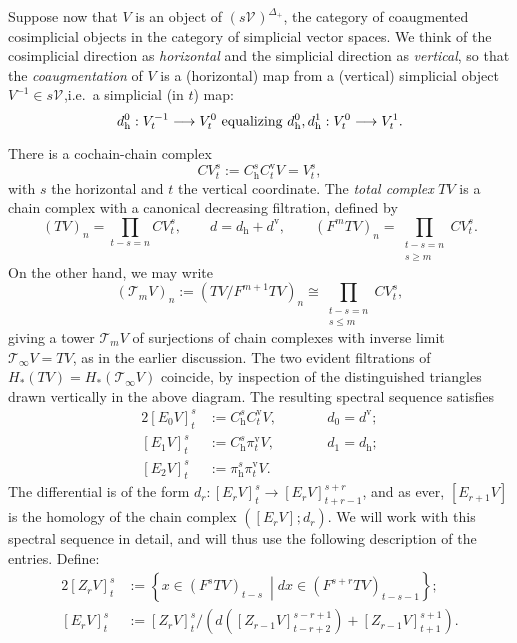 \documentclass[11pt]{amsart} \renewcommand{\baselinestretch}{1.2}
\theoremstyle{plain}
\theoremstyle{definition}
\renewcommand{\to}{\longrightarrow}
\newcommand{\calT}{\mathcal{T}}
\newcommand{\calV}{\mathcal{V}}
\newcommand{\vect}[2]{\calV^{#1}_{#2}}
\newcommand{\E}[5]{[E^{#1}_{#2}#3]^{#4}_{#5}}
\newcommand{\Edownup}[5]{[E_{#1}^{#2}#3]^{#4}_{#5}}
\newcommand{\EZ}[5]{[Z^{#1}_{#2}#3]^{#4}_{#5}}
\newcommand{\uver}{^\mathrm{v}}
\newcommand{\dhor}{_\mathrm{h}}
\begin{document}
\begin{Conventions and notation}
Suppose now that $V$ is an object of $(s\vect{}{})^{\Delta_+}$, the category of coaugmented cosimplicial objects in the category of simplicial vector spaces. We think of the cosimplicial direction as \emph{horizontal} and the simplicial direction as \emph{vertical}, so that the \emph{coaugmentation} of $V$ is a (horizontal) map from a (vertical) simplicial object $V^{-1}\in s\vect{}{}$,i.e.\ a simplicial (in $t$) map:
\[d\dhor^0:V_{t}^{-1}\to V^{0}_{t}\textup{ equalizing }d\dhor^0,d\dhor^1:V^{0}_{t}\to V^{1}_{t}.\]

There is a cochain-chain complex 
\[CV^{s}_{t}:=C\dhor^{s}C\uver_{t}V=V^{s}_{t},\]
with $s$ the horizontal and $t$ the vertical coordinate. The \emph{total complex} $TV$ is a chain complex with a canonical decreasing filtration, defined by 
\[\textstyle(TV)_n=\prod_{t-s=n}CV^{s}_{t},\qquad d=d\dhor+d\uver,\qquad(F^mTV)_n=\prod_{\substack{t-s=n\\s\geq m}}CV^{s}_{t}.\]
On the other hand, we may write
\[(\calT_mV)_n:=(TV/F^{m+1} TV)_n\cong\textstyle\prod_{\substack{t-s=n\\s\leq m}}CV^{s}_{t}, \]
giving a tower $\calT_mV$ of surjections of chain complexes with inverse limit $\calT_\infty V=TV$, as in the earlier discussion. The two evident filtrations of $H_*(TV)=H_*(\calT_\infty V)$ coincide, by inspection of the distinguished triangles drawn vertically in the above diagram. The resulting spectral sequence satisfies
\begin{alignat*}{2}
\Edownup{0}{}{V}{s}{t}
&:=
C\dhor^sC\uver_tV,
&\qquad&d_0=d\uver;\\
\Edownup{1}{}{V}{s}{t}
&:=
C\dhor^s\pi\uver_tV,
&\qquad&d_1=d\dhor;\\
\Edownup{2}{}{V}{s}{t}
&:=
\pi\dhor^s\pi\uver_tV.
\end{alignat*}
The differential is of the form $d_r:\Edownup{r}{}{V}{s}{t}\to \Edownup{r}{}{V}{s+r}{t+r-1}$, and as ever, $\Edownup{r+1}{}{V}{}{}$ is the homology of the chain complex $(\Edownup{r}{}{V}{}{};d_r)$. We will work with this spectral sequence in detail, and will thus use the following description of the entries. Define:
\begin{alignat*}{2}
\EZ{}{r}{V}{s}{t}&:=\left\{x\in (F^sTV)_{t-s}\ \middle| dx\in (F^{s+r}TV)_{t-s-1}\right\};\\
\E{}{r}{V}{s}{t}&:=\EZ{}{r}{V}{s}{t}/\left(d\left(\EZ{}{r-1}{V}{s-r+1}{t-r+2}\right)+\EZ{}{r-1}{V}{s+1}{t+1}\right).
\end{alignat*}



\end{Conventions and notation}
\end{document}
